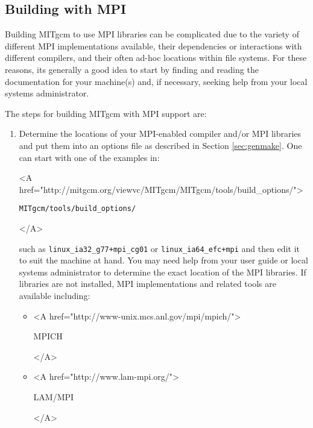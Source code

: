 \subsection{Building with MPI}
\label{sec:mpi-build}

Building MITgcm to use MPI libraries can be complicated due to the
variety of different MPI implementations available, their dependencies
or interactions with different compilers, and their often ad-hoc
locations within file systems.  For these reasons, its generally a
good idea to start by finding and reading the documentation for your
machine(s) and, if necessary, seeking help from your local systems
administrator.

The steps for building MITgcm with MPI support are:
\begin{enumerate}
  
\item Determine the locations of your MPI-enabled compiler and/or MPI
  libraries and put them into an options file as described in Section
  \ref{sec:genmake}.  One can start with one of the examples in:
  \begin{rawhtml} <A
    href="http://mitgcm.org/viewvc/MITgcm/MITgcm/tools/build_options/">
  \end{rawhtml}
  \begin{center}
    \texttt{MITgcm/tools/build\_options/}
  \end{center}
  \begin{rawhtml} </A> \end{rawhtml}
  such as \texttt{linux\_ia32\_g77+mpi\_cg01} or
  \texttt{linux\_ia64\_efc+mpi} and then edit it to suit the machine at
  hand.  You may need help from your user guide or local systems
  administrator to determine the exact location of the MPI libraries.
  If libraries are not installed, MPI implementations and related
  tools are available including:
  \begin{itemize}
  \item \begin{rawhtml} <A
      href="http://www-unix.mcs.anl.gov/mpi/mpich/">
    \end{rawhtml}
    MPICH
    \begin{rawhtml} </A> \end{rawhtml}

  \item \begin{rawhtml} <A
      href="http://www.lam-mpi.org/">
    \end{rawhtml}
    LAM/MPI
    \begin{rawhtml} </A> \end{rawhtml}


\end{itemize}
\end{enumerate}
